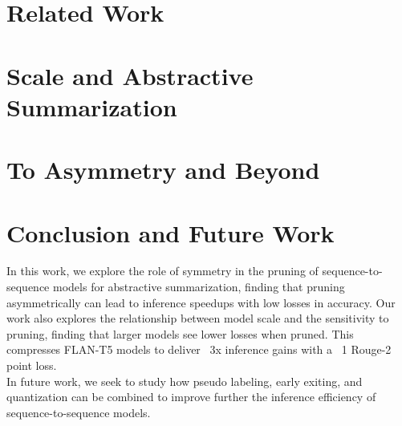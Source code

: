 \section{Related Work}

\section{Scale and Abstractive Summarization}

\section{To Asymmetry and Beyond}

\section{Conclusion and Future Work}
In this work, we explore the role of symmetry in the pruning of sequence-to-sequence models for abstractive summarization, finding that pruning asymmetrically can lead to inference speedups with low losses in accuracy. Our work also explores the relationship between model scale and the sensitivity to pruning, finding that larger models see lower losses when pruned. This compresses FLAN-T5 models to deliver ~3x inference gains with a ~1 Rouge-2 point loss. \\
In future work, we seek to study how pseudo labeling, early exiting, and quantization can be combined to improve further the inference efficiency of sequence-to-sequence models.  